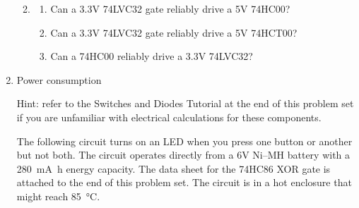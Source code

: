 \documentclass{e85}
\begin{document}
\begin{enumerate}
\begin{enumerate}
    \begin{solution}

    \end{solution}

  \item
    \begin{enumerate}
    \item Can a 3.3V 74LVC32 gate reliably drive a 5V 74HC00?

      \begin{solution}

      \end{solution}

    \item Can a 3.3V 74LVC32 gate reliably drive a 5V 74HCT00?

      \begin{solution}

      \end{solution}

    \item Can a 74HC00 reliably drive a 3.3V 74LVC32?

      \begin{solution}

      \end{solution}
    \end{enumerate}
  \end{enumerate}

\item Power consumption

  Hint: refer to the Switches and Diodes Tutorial at the end of this
  problem set if you are unfamiliar with electrical calculations for
  these components.

  The following circuit turns on an LED when you press one button or
  another but not both.  The circuit operates directly from a 6V
  Ni--MH battery with a \SI{280}{\mA\hour} energy capacity.  The data
  sheet for the 74HC86 XOR gate is attached to the end of this problem
  set.  The circuit is in a hot enclosure that might reach
  \SI{85}{\celsius}.
  \begin{center}
\end{center}
\end{enumerate}
\end{document}
